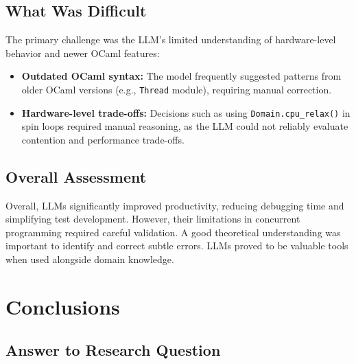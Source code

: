 \documentclass[11pt,a4paper]{article}
\begin{document}
\subsection*{What Was Difficult}

The primary challenge was the LLM's limited understanding of hardware-level behavior and newer OCaml features:

\begin{itemize}
    \item \textbf{Outdated OCaml syntax:} The model frequently suggested patterns from older OCaml versions (e.g., \texttt{Thread} module), requiring manual correction.
    
    \item \textbf{Hardware-level trade-offs:} Decisions such as using \texttt{Domain.cpu\_relax()} in spin loops required manual reasoning, as the LLM could not reliably evaluate contention and performance trade-offs.
\end{itemize}

\subsection*{Overall Assessment}

Overall, LLMs significantly improved productivity, reducing debugging time and simplifying test development. However, their limitations in concurrent programming required careful validation. A good theoretical understanding was important to identify and correct subtle errors. LLMs proved to be valuable tools when used alongside domain knowledge.

\section{Conclusions}
\label{sec:conclusions}
\subsection*{Answer to Research Question}
\end{document}
